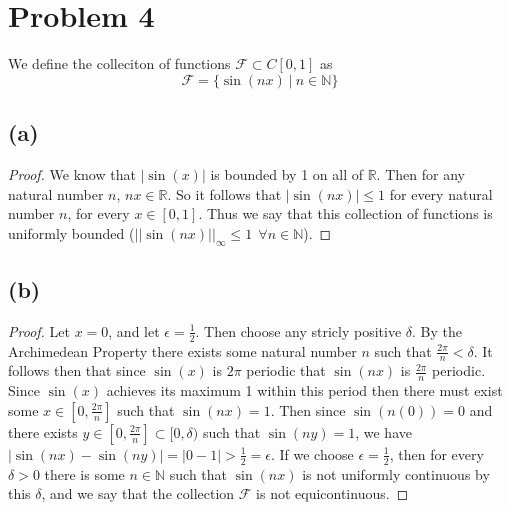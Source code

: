 \documentclass{article}
\theoremstyle{definition}
\begin{document}
\section*{Problem 4}
\begin{mdframed}
    We define the colleciton of functions $\mathcal{F} \subset C[0,1]$ as 
    \[
        \mathcal{F} = \{\sin(nx) \ | \ n \in \mathbb{N}\}
    \]
\end{mdframed}
\subsection*{(a)}
    \begin{proof}
        We know that $|\sin(x)|$ is bounded by 1 on all of $\mathbb{R}$. Then for any natural number $n$,
        $nx \in \mathbb{R}$. So it follows that $|\sin(nx)| \leqslant 1$ for every natural number $n$, for every $x \in [0,1]$. Thus 
        we say that this collection of functions is uniformly bounded ($||\sin(nx)||_\infty \leqslant 1  \ \ \forall n \in \mathbb{N}$).
    \end{proof}
\subsection*{(b)}
    \begin{proof}
        Let $x = 0$, and let $\epsilon = \frac{1}{2}$.
        Then choose any stricly positive $\delta$.
        By the Archimedean Property there exists some natural number $n$ such that $\frac{ 2 \pi}{n} < \delta$.
        It follows then that since $\sin(x)$ is $2\pi$ periodic that $\sin(nx)$ is $\frac{2\pi}{n}$ periodic. Since 
        $\sin(x)$ achieves its maximum 1 within this period then there must exist some $x \in [0,\frac{2\pi}{n}]$ such that 
        $\sin(nx) = 1$. Then since $\sin(n(0)) = 0$ and there exists $y \in [0,\frac{2\pi}{n}] \subset [0, \delta)$ such that 
        $\sin(ny) = 1$, we have $|\sin(nx) - \sin(ny)| = |0 - 1| > \frac{1}{2} = \epsilon$. If we choose $\epsilon = \frac{1}{2}$,
        then for every $\delta > 0$ there is some $n \in \mathbb{N}$ such that $\sin(nx)$ is not uniformly continuous by this $\delta$, and we say
        that the collection $\mathcal{F}$ is not equicontinuous.
    \end{proof}
\end{document}
